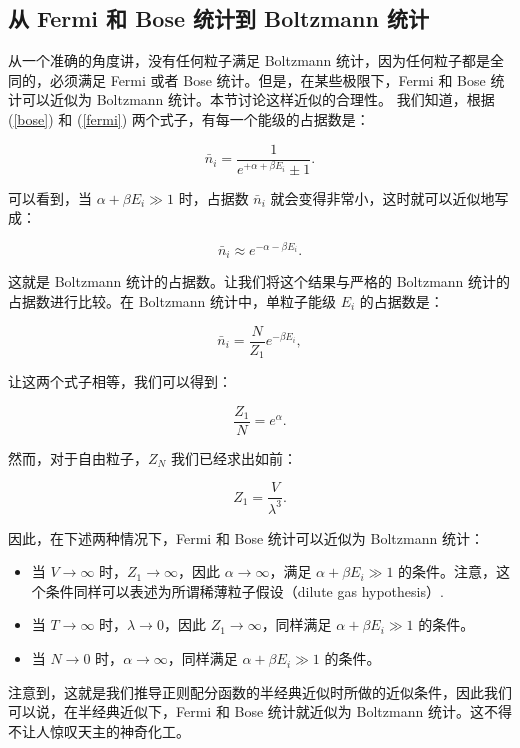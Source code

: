 \subsection{从 Fermi 和 Bose 统计到 Boltzmann 统计}
从一个准确的角度讲，没有任何粒子满足 Boltzmann 统计，因为任何粒子都是全同的，必须满足 Fermi 或者 Bose 统计。但是，在某些极限下，Fermi 和 Bose 统计可以近似为 Boltzmann 统计。本节讨论这样近似的合理性。
我们知道，根据 (\ref{bose}) 和 (\ref{fermi}) 两个式子，有每一个能级的占据数是：
\begin{linenomath}\begin{equation}
    \bar n_i = \frac{1}{e^{+\alpha + \beta E_i} \pm 1}.
\end{equation}\end{linenomath}
可以看到，当 $\alpha + \beta E_i \gg 1$ 时，占据数 $\bar n_i$ 就会变得非常小，这时就可以近似地写成：
\begin{linenomath}\begin{equation}
    \bar n_i \approx e^{-\alpha - \beta E_i}.
\end{equation}\end{linenomath}
这就是 Boltzmann 统计的占据数。让我们将这个结果与严格的 Boltzmann 统计的占据数进行比较。在 Boltzmann 统计中，单粒子能级 $E_i$ 的占据数是：
\begin{linenomath}\begin{equation}
    \bar n_i = \frac{N}{Z_1} e^{-\beta E_i},
\end{equation}\end{linenomath}
让这两个式子相等，我们可以得到：
\begin{linenomath}\begin{equation}
    \frac{Z_1}{N} = e^{\alpha}.
\end{equation}\end{linenomath}
然而，对于自由粒子，$Z_N$ 我们已经求出如前：
\begin{linenomath}\begin{equation}
    Z_1 = \frac{V}{\lambda^{3}}.
\end{equation}\end{linenomath}
因此，在下述两种情况下，Fermi 和 Bose 统计可以近似为 Boltzmann 统计：
\begin{itemize}
    \item 当 $V \to \infty$ 时，$Z_1 \to \infty$，因此 $\alpha \to \infty$，满足 $\alpha + \beta E_i \gg 1$ 的条件。注意，这个条件同样可以表述为所谓稀薄粒子假设（dilute gas hypothesis）.
    \item 当 $T \to \infty$ 时，$\lambda \to 0$，因此 $Z_1 \to \infty$，同样满足 $\alpha + \beta E_i \gg 1$ 的条件。
    \item 当 $N \to 0$ 时，$\alpha \to \infty$，同样满足 $\alpha + \beta E_i \gg 1$ 的条件。
\end{itemize}
注意到，这就是我们推导正则配分函数的半经典近似时所做的近似条件，因此我们可以说，在半经典近似下，Fermi 和 Bose 统计就近似为 Boltzmann 统计。这不得不让人惊叹天主的神奇化工。

